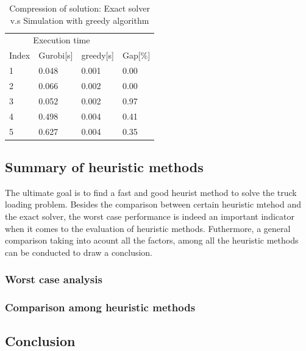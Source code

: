 \documentclass{article}
\begin{document}
\begin{table}[ht]
 \caption{Compression of solution: Exact solver v.s Simulation with greedy algorithm}
  \centering
  \begin{tabular}{llll}
    \toprule
    \multicolumn{3}{c}{Execution time}                   \\
    \cmidrule(r){2-3}
    Index   & Gurobi[s]     & greedy[s]      & Gap[\%] \\
    \midrule
    1	&	0.048 	&	0.001 	&	0.00 	\\
    2	&	0.066 	&	0.002 	&	0.00 	\\
    3	&	0.052 	&	0.002 	&	0.97 	\\
    4	&	0.498 	&	0.004 	&	0.41 	\\
    5	&	0.627 	&	0.004 	&	0.35 	\\
    \bottomrule
  \end{tabular}
  \label{tab:exact_greedy}
\end{table}

\subsection{Summary of heuristic methods}
The ultimate goal is to find a fast and good heurist method to solve the truck loading problem. Besides the comparison between certain heuristic mtehod and the exact solver, the worst case performance is indeed an important indicator when it comes to the evaluation of heuristic methods. Futhermore, a general comparison taking into acount all the factors, among all the heuristic methods can be conducted to draw a conclusion.

\subsubsection{Worst case analysis}

\subsubsection{Comparison among heuristic methods}

\subsection{Conclusion }


  
\end{document}
